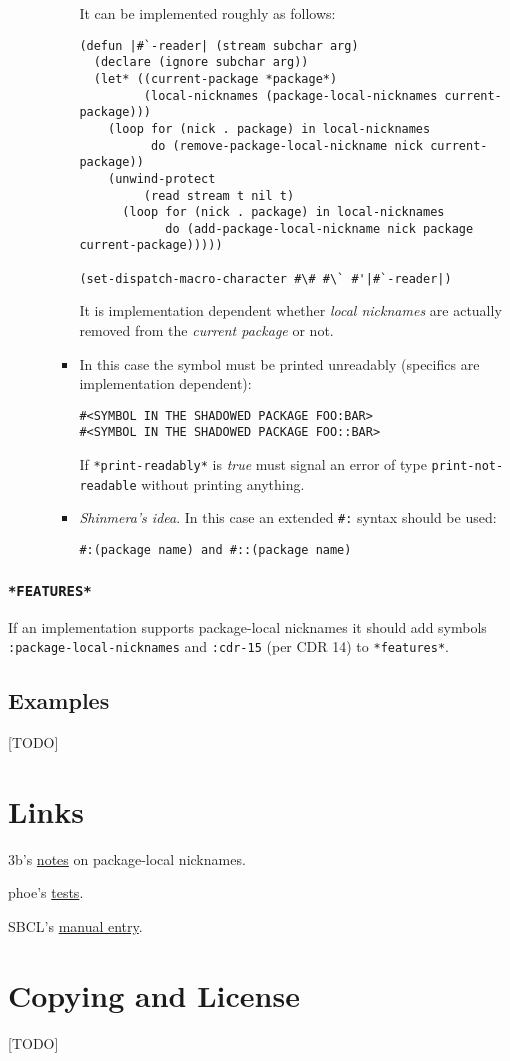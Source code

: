 \documentclass[11pt]{article}
\begin{document}
\begin{enumerate}
\begin{enumerate}
\begin{itemize}
It can be implemented roughly as follows:
\begin{verbatim}
(defun |#`-reader| (stream subchar arg)
  (declare (ignore subchar arg))
  (let* ((current-package *package*)
         (local-nicknames (package-local-nicknames current-package)))
    (loop for (nick . package) in local-nicknames
          do (remove-package-local-nickname nick current-package))
    (unwind-protect
         (read stream t nil t)
      (loop for (nick . package) in local-nicknames
            do (add-package-local-nickname nick package current-package)))))

(set-dispatch-macro-character #\# #\` #'|#`-reader|)
\end{verbatim}
It is implementation dependent whether \emph{local nicknames} are actually
removed from the \emph{current package} or not.
\item In this case the symbol must be printed unreadably (specifics are
implementation dependent):
\begin{verbatim}
#<SYMBOL IN THE SHADOWED PACKAGE FOO:BAR>
#<SYMBOL IN THE SHADOWED PACKAGE FOO::BAR>
\end{verbatim}

If \texttt{*print-readably*} is \emph{true} must signal an error of type
\texttt{print-not-readable} without printing anything.
\item \emph{Shinmera's idea}. In this case an extended \texttt{\#:} syntax should be used:
\begin{verbatim}
#:(package name) and #::(package name)
\end{verbatim}
\end{itemize}
\end{enumerate}
\end{enumerate}
\subsubsection{\texttt{*FEATURES*}}
\label{sec:org372e6cd}
If an implementation supports package-local nicknames it should add symbols
\texttt{:package-local-nicknames} and \texttt{:cdr-15} (per CDR 14) to \texttt{*features*}.
\subsection{Examples}
\label{sec:org8ea7b05}
[TODO]
\section{Links}
\label{sec:orge4278ef}
3b's \href{https://github.com/3b/package-local-nicknames/blob/master/docs.org}{notes} on package-local nicknames.

phoe's \href{https://github.com/phoe/trivial-package-local-nicknames}{tests}.

SBCL's \href{https://www.sbcl.org/manual/\#Package\_002dLocal-Nicknames}{manual entry}.
\section{Copying and License}
\label{sec:orgab3f7d1}
[TODO]
\end{document}
